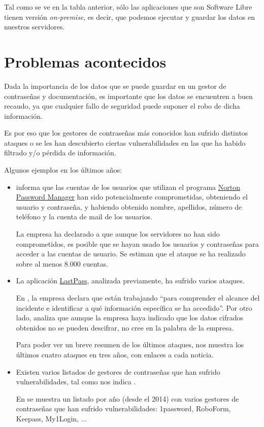 \documentclass{\ClassPath/viu-tfm-template}
\begin{document}
Tal como se ve en la tabla anterior, sólo las aplicaciones que son Software Libre tienen versión \textit{on-premise}, es decir, que podemos ejecutar y guardar los datos en nuestros servidores.


\section{Problemas acontecidos}

Dada la importancia de los datos que se puede guardar en un gestor de contraseñas y documentación, es importante que los datos se encuentren a buen recaudo, ya que cualquier fallo de seguridad puede suponer el robo de dicha información.

Es por eso que los gestores de contraseñas más conocidos han sufrido distintos ataques o se les han descubierto ciertas vulnerabilidades en las que ha habido filtrado y/o pérdida de información.

Algunos ejemplos en los últimos años:

\begin{itemize}
    \item \textcite{norton} informa que las cuentas de los usuarios que utilizan el programa \href{https://us.norton.com/feature/password-manager}{Norton Password Manager} han sido potencialmente comprometidas, obteniendo el usuario y contraseña, y habiendo obtenido nombre, apellidos, número de teléfono y la cuenta de mail de los usuarios.

    La empresa ha declarado a \textcite{norton2} que aunque los servidores no han sido comprometidos, es posible que se hayan usado los usuarios y contraseñas para acceder a las cuentas de usuario. Se estiman que el ataque se ha realizado sobre al menos 8.000 cuentas.

    \item La aplicación \href{https://www.lastpass.com/}{LastPass}, analizada previamente, ha sufrido varios ataques.

    En \textcite{lastpass}, la empresa declara que están trabajando “para comprender el alcance del incidente e identificar a qué información específica se ha accedido”. Por otro lado, \textcite{lastpass2} analiza que aunque la empresa haya indicado que los datos cifrados obtenidos no se pueden descifrar, no cree en la palabra de la empresa.

    Para poder ver un breve resumen de los últimos ataques, \textcite{lastpass3} nos muestra los últimos cuatro ataques en tres años, con enlaces a cada noticia.

    \item Existen varios listados de gestores de contraseñas que han sufrido vulnerabilidades, tal como nos indica \textcite{hacked2}.

    En \textcite{hacked} se muestra un listado por año (desde el 2014) con varios gestores de contraseñas que han sufrido vulnerabilidades: 1password, RoboForm, Keepass, My1Login, ...

\end{itemize}
\end{document}
